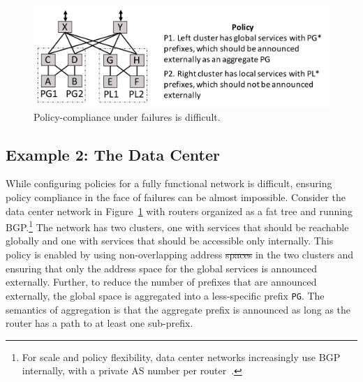 \documentclass[10pt]{sigalternate052015} %
\newcommand{\CD}[1]{\texttt{\small #1}}  %
\providecommand{\DIFadd}[1]{{\protect\color{blue}\uwave{#1}}} %
\providecommand{\DIFdel}[1]{{\protect\color{red}\sout{#1}}}                      %
\providecommand{\DIFaddbegin}{} %
\providecommand{\DIFaddend}{} %
\providecommand{\DIFdelbegin}{} %
\providecommand{\DIFdelend}{} %
\begin{document}
\DIFdelbegin %
\DIFdelend \DIFaddbegin \begin{figure}[t!]
  \centering
  \includegraphics[width=\columnwidth]{figures/example2}
  \caption{Policy-compliance under failures is difficult.}
  \label{fig:example2}
  \vspace{-1em}
\end{figure}
\DIFaddend 

\subsection{Example 2:  The Data Center}

 While configuring policies for a fully functional network is difficult, ensuring policy compliance in the face of failures can be almost impossible. Consider the data center network in Figure~\ref{fig:example2} with routers organized as a fat tree and running BGP.\footnote{For scale and policy flexibility, data center networks increasingly use BGP internally, with a private AS number per router~\cite{bgp-in-dc}.} The network has two clusters, one with services that should be reachable globally and one with services that should be accessible only internally. This policy is enabled by using non-overlapping address \DIFdelbegin \DIFdel{spaces }\DIFdelend \DIFaddbegin \DIFadd{space }\DIFaddend in the two clusters and ensuring that only the address space for the global services is announced externally. Further, to reduce the number of prefixes that are announced externally, the global space is aggregated into a less-specific prefix \CD{PG}. The semantics of aggregation is that the aggregate prefix is announced as long as the router has a path to at least one sub-prefix.
\end{document}
